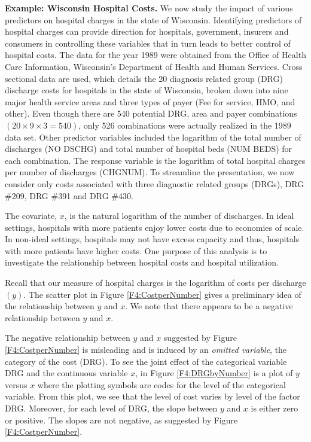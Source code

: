 \linejed


 

\textbf{Example: Wisconsin Hospital Costs.} We now study the impact of various predictors on hospital
charges in the state of Wisconsin. Identifying predictors of
hospital charges can provide direction for hospitals, government,
insurers and consumers in controlling these variables that in turn
leads to better control of hospital costs. The data for the year
1989 were obtained from the Office of Health Care Information,
Wisconsin's Department of Health and Human Services. Cross sectional
data are used, which details the 20 diagnosis related group (DRG)
discharge costs for hospitals in the state of Wisconsin, broken down
into nine major health service areas and three types of payer (Fee
for service, HMO, and other). Even though there are 540 potential
DRG, area and payer combinations $(20\times 9\times 3=540)$, only
526 combinations were actually realized in the 1989 data set. Other
predictor variables included the logarithm of the total number of
discharges (NO DSCHG) and total number of hospital beds (NUM BEDS)
for each combination. The response variable is the logarithm of
total hospital charges per number of discharges (CHGNUM). To
streamline the presentation, we now consider only costs associated
with three diagnostic related groups (DRGs), DRG \#209, DRG \#391
and DRG \#430.

The covariate, $x$, is the natural logarithm of the number of
discharges. In ideal settings, hospitals with more patients enjoy
lower costs due to economies of scale. In non-ideal settings,
hospitals may not have excess capacity and thus, hospitals with more
patients have higher costs. One purpose of this analysis is to
investigate the relationship between hospital costs and hospital
utilization.

Recall that our measure of hospital charges is the logarithm of
costs per discharge $(y)$. The scatter plot in Figure
\ref{F4:CostperNumber} gives a preliminary idea of the relationship
between $y$ and $x$. We note that there appears to be a negative
relationship between $y$ and $x$.

The negative relationship between $y$ and $x$ suggested by Figure
\ref{F4:CostperNumber} is misleading and is induced by an
\textit{omitted variable}, the category of the cost (DRG). To see
the joint effect of the categorical variable DRG and the continuous
variable $x$, in Figure \ref{F4:DRGbyNumber} is a plot of $y$ versus
$x$ where the plotting symbols are codes for the level of the
categorical variable. From this plot, we see that the level of cost
varies by level of the factor DRG. Moreover, for each level of DRG,
the slope between $y$ and $x$ is either zero or positive. The slopes
are not negative, as suggested by Figure \ref{F4:CostperNumber}.

